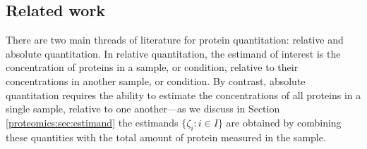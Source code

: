 
%
%

%



\subsection{Related work}

There are two main threads of literature for protein quantitation: relative and absolute quantitation. 
In relative quantitation, the estimand of interest is the concentration of proteins in a sample, or condition, relative to their concentrations in another sample, or condition. By contrast, absolute quantitation requires the ability to estimate the concentrations of all proteins in a single sample, relative to one another---as we discuss in Section \ref{proteomics:sec:estimand} the estimands $\{\zeta_i:i\in I\}$ are obtained by combining these quantities with the total amount of protein measured in the sample.

